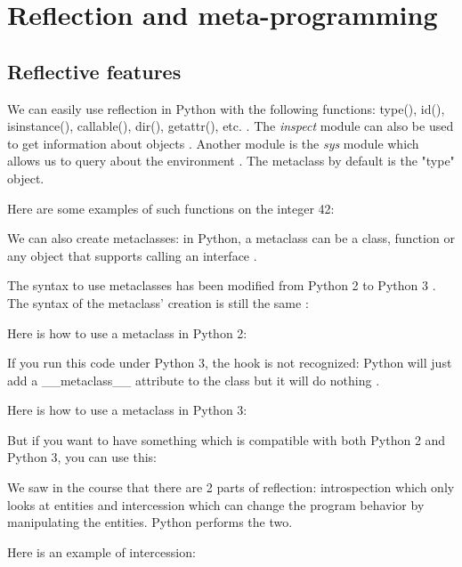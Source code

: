 \section{Reflection and meta-programming}
\subsection{Reflective features}
\label{reflection}
We can easily use reflection in Python with the following functions: type(), id(), isinstance(), callable(), dir(), getattr(), etc. \cite{python_doc_functions}.
The \textit{inspect} module can also be used to get information about objects \cite{python_doc_inspect}. Another module is the \textit{sys} module which allows us to query about the environment \cite{zetcode_introspection}.
The metaclass by default is the "type" object.

Here are some examples of such functions on the integer 42:


We can also create metaclasses: in Python, a metaclass can be a class, function or any object that supports calling an interface \cite{pythoncentral_metaclasses}.

The syntax to use metaclasses has been modified from Python 2 to Python 3 \cite{mikewatkins_metaclasses}. The syntax of the metaclass' creation is still the same \cite{python_doc_datamodel}:


Here is how to use a metaclass in Python 2:

If you run this code under Python 3, the hook is not recognized: Python will just add a \_\_metaclass\_\_ attribute to the class but it will do nothing \cite{artima_metaclasses_1of2}.
\newline

Here is how to use a metaclass in Python 3:


But if you want to have something which is compatible with both Python 2 and Python 3, you can use this:


We saw in the course that there are 2 parts of reflection: introspection which only looks at entities and intercession which can change the program behavior by manipulating the entities. %
Python performs the two.
\newline

Here is an example of intercession:


